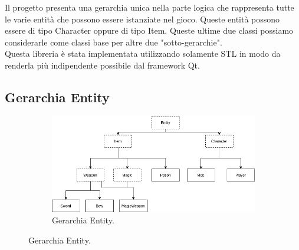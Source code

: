 \documentclass[../relazione.tex]{subfiles}
\begin{document}
Il progetto presenta una gerarchia unica nella parte logica che rappresenta tutte le varie entità che possono essere istanziate nel gioco.
Queste entità possono essere di tipo Character oppure di tipo Item. Queste ultime due classi possiamo considerarle come classi base per altre due "sotto-gerarchie".\\
Questa libreria è stata implementata utilizzando solamente STL in modo da renderla più indipendente possibile dal framework Qt.\\
\subsection{Gerarchia Entity}

\begin{figure}[h]
    \centering
    \begin{subfigure}[b]{1\linewidth}
        \includegraphics[width=\linewidth]{img/entity.png}
        \caption{Gerarchia Entity.}
    \end{subfigure}
    \label{fig:gerarchia-entity}
\end{figure}
\end{document}
